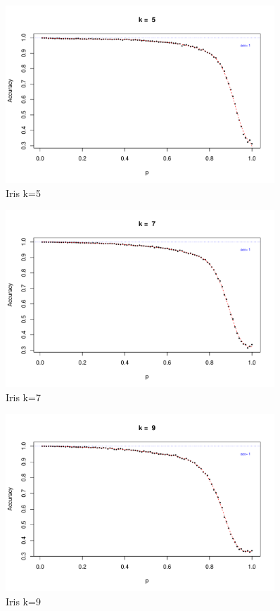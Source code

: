 \documentclass{article}
\begin{document}
\begin{figure}
 \centering
 \includegraphics[width=0.9\textwidth]{./figures/Iris_k5.pdf}
 \caption{Iris k=5}
 \label{fig:iris5}
\end{figure}
\begin{figure}
 \centering
 \includegraphics[width=0.9\textwidth]{./figures/Iris_k7.pdf}
 \caption{Iris k=7}
 \label{fig:iris7}
\end{figure}
\begin{figure}
 \centering
 \includegraphics[width=0.9\textwidth]{./figures/Iris_k9.pdf}
 \caption{Iris k=9}
 \label{fig:iris9}
\end{figure}
\end{document}
